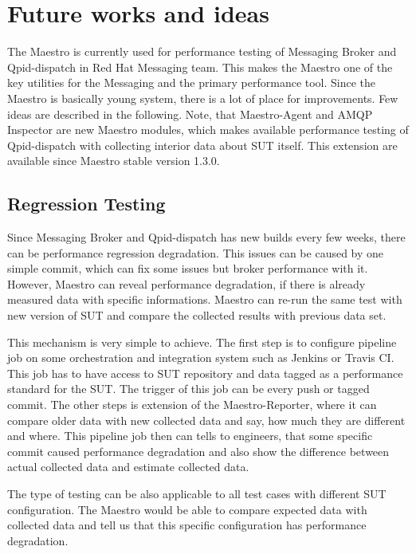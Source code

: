 
\chapter{Future works and ideas}
\label{Future works and ideas}
The Maestro is currently used for performance testing of Messaging Broker and Qpid-dispatch in Red Hat Messaging team. This makes the Maestro one of the key utilities for the Messaging and the primary performance tool. Since the Maestro is basically young system, there is a lot of place for improvements. Few ideas are described in the following. Note, that Maestro-Agent and AMQP Inspector are new Maestro modules, which makes available performance testing of Qpid-dispatch with collecting interior data about SUT itself. This extension are available since Maestro stable version 1.3.0.

\section{Regression Testing}
Since Messaging Broker and Qpid-dispatch has new builds every few weeks, there can be performance regression degradation. This issues can be caused by one simple commit, which can fix some issues but broker performance with it. However, Maestro can reveal performance degradation, if there is already measured data with specific informations. Maestro can re-run the same test with new version of SUT and compare the collected results with previous data set.

This mechanism is very simple to achieve. The first step is to configure pipeline job on some orchestration and integration system such as Jenkins or Travis CI. This job has to have access to SUT repository and data tagged as a performance standard for the SUT. The trigger of this job can be every push or tagged commit. The other steps is extension of the Maestro-Reporter, where it can compare older data with new collected data and say, how much they are different and where. This pipeline job then can tells to engineers, that some specific commit caused performance degradation and also show the difference between actual collected data and estimate collected data.

The type of testing can be also applicable to all test cases with different SUT configuration. The Maestro would be able to compare expected data with collected data and tell us that this specific configuration has performance degradation.

